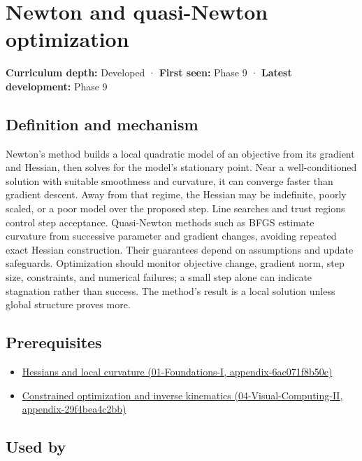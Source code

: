 \hypertarget{appendix-54c8f5828387}{}
\section{Newton and quasi-Newton optimization}\label{appendix-54c8f5828387-newton-and-quasi-newton-optimization}

\textbf{Curriculum depth:} Developed · \textbf{First seen:} Phase 9 · \textbf{Latest development:} Phase 9

\subsection{Definition and mechanism}\label{appendix-54c8f5828387-definition-and-mechanism}

Newton's method builds a local quadratic model of an objective from its gradient and Hessian, then solves for the model's stationary point. Near a well-conditioned solution with suitable smoothness and curvature, it can converge faster than gradient descent. Away from that regime, the Hessian may be indefinite, poorly scaled, or a poor model over the proposed step. Line searches and trust regions control step acceptance. Quasi-Newton methods such as BFGS estimate curvature from successive parameter and gradient changes, avoiding repeated exact Hessian construction. Their guarantees depend on assumptions and update safeguards. Optimization should monitor objective change, gradient norm, step size, constraints, and numerical failures; a small step alone can indicate stagnation rather than success. The method's result is a local solution unless global structure proves more.

\subsection{Prerequisites}\label{appendix-54c8f5828387-prerequisites}

\begin{itemize}
\tightlist
\item
  \href{../01-Foundations-I/main.pdf\#nameddest=appendix-6ac071f8b50c}{Hessians and local curvature (01-Foundations-I, appendix-6ac071f8b50c)}
\item
  \href{../04-Visual-Computing-II/main.pdf\#nameddest=appendix-29f4bea4c2bb}{Constrained optimization and inverse kinematics (04-Visual-Computing-II, appendix-29f4bea4c2bb)}
\end{itemize}

\subsection{Used by}\label{appendix-54c8f5828387-used-by}

